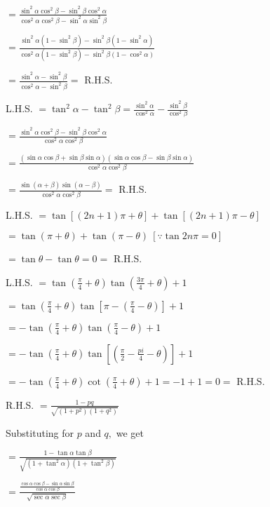   $= \frac{\sin^2\alpha\cos^2\beta - \sin^2\beta\cos^2\alpha}{\cos^2\alpha\cos^2\beta - \sin^2\alpha\sin^2\beta}$

  $= \frac{\sin^2\alpha(1 - \sin^2\beta) - \sin^2\beta(1 - \sin^2\alpha)}{\cos^2\alpha(1 - \sin^2\beta) - \sin^2\beta(1 - \cos^2\alpha)}$

  $= \frac{\sin^2\alpha - \sin^2\beta}{\cos^2\alpha - \sin^2\beta} =$ R.H.S.

\item L.H.S. $= \tan^2\alpha -\tan^2\beta = \frac{\sin^2\alpha}{\cos^2\alpha} - \frac{\sin^2\beta}{\cos^2\beta}$

  $= \frac{\sin^2\alpha\cos^2\beta - \sin^2\beta\cos^2\alpha}{\cos^2\alpha\cos^2\beta}$

  $= \frac{(\sin\alpha\cos\beta + \sin\beta\sin\alpha)(\sin\alpha\cos\beta - \sin\beta\sin\alpha)}{\cos^2\alpha\cos^2\beta}$

  $= \frac{\sin(\alpha + \beta)\sin(\alpha - \beta)}{\cos^2\alpha\cos^2\beta} =$ R.H.S.

\item L.H.S. $= \tan[(2n + 1)\pi + \theta] + \tan[(2n + 1)\pi - \theta]$

  $= \tan(\pi + \theta) + \tan(\pi - \theta)~[\because \tan 2n\pi = 0]$

  $= \tan\theta - \tan\theta = 0 =$ R.H.S.

\item L.H.S. $= \tan\left(\frac{\pi}{4} + \theta\right)\tan\left(\frac{3\pi}{4} + \theta\right) + 1$

  $= \tan\left(\frac{\pi}{4} + \theta\right)\tan\left[\pi - \left(\frac{\pi}{4} - \theta\right)\right] + 1$

  $= -\tan\left(\frac{\pi}{4} + \theta\right)\tan\left(\frac{\pi}{4} - \theta\right) + 1$

  $= -\tan\left(\frac{\pi}{4} + \theta\right)\tan\left[\left(\frac{\pi}{2} - \frac{pi}{4} - \theta\right)\right] + 1$

  $= -\tan\left(\frac{\pi}{4} + \theta\right)\cot\left(\frac{\pi}{4} + \theta\right) + 1 = -1 + 1 = 0 =$ R.H.S.

\item R.H.S. $= \frac{1 - pq}{\sqrt{(1 + p^2)(1 + q^2)}}$

  Substituting for $p$ and $q,$ we get

  $= \frac{1 - \tan\alpha\tan\beta}{\sqrt{(1 + \tan^2\alpha)(1 + \tan^2\beta)}}$

  $= \frac{\frac{\cos\alpha\cos\beta - \sin\alpha\sin\beta}{\cos\alpha\cos\beta}}{\sqrt{\sec\alpha\sec\beta}}$

